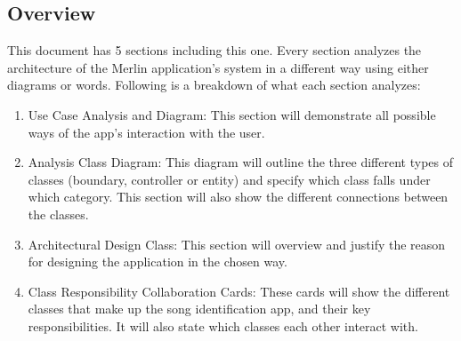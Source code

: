 \documentclass[]{article}
\begin{document}
\subsection{Overview}
\label{sub:overview}
This document has 5 sections including this one. Every section analyzes the architecture of the Merlin application’s system in a different way using either diagrams or words. Following is a breakdown of what each section analyzes: 
\begin{enumerate}[1)]
	\item Use Case Analysis and Diagram: This section will demonstrate all possible ways of the app’s interaction with the user. 
	\item Analysis Class Diagram: This diagram will outline the three different types of classes (boundary, controller or entity) and specify which class falls under which category. This section will also show the different connections between the classes.
	\item Architectural Design Class: This section will overview and justify the reason for designing the application in the chosen way. 
	\item Class Responsibility Collaboration Cards: These cards will show the different classes that make up the song identification app, and their key responsibilities. It will also state which classes each other interact with. 
\end{enumerate}

\end{document}
